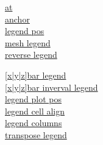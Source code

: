 {\color{blue}
\begin{minipage}[t]{3.0cm}
\href{\docurl\#pgfp./pgfplots/at}{at}\\
\href{\docurl\#pgfp./pgfplots/anchor}{anchor}\\
\href{\docurl\#pgfp./pgfplots/legend:pos}{legend pos}\\
\href{\docurl\#pgfp./pgfplots/mesh:legend}{mesh legend}\\
\href{\docurl\#pgfp./pgfplots/reverse:legend}{reverse legend}
\end{minipage}
\begin{minipage}[t]{3.0cm}
\href{\docurl\#pgfp./pgfplots/}{{[x|y|z]}bar legend}\\
\href{\docurl\#pgfp./pgfplots/}{{[x|y|z]}bar inverval legend}\\
\href{\docurl\#pgfp./pgfplots/}{legend plot pos}\\
\href{\docurl\#pgfp./pgfplots/}{legend cell align}\\
\href{\docurl\#pgfp./pgfplots/}{legend columns}\\
\href{\docurl\#pgfp./pgfplots/}{transpose legend}
\end{minipage}}

\begin{comment}
\textit{The following styles\textsuperscript{S} are available:}
{\color{blue}
\begin{minipage}[t]{3.6cm}
\href{\docurl\#pgfp./pgfplots/legend:style}{legend style}\\
\href{\docurl\#pgfp./pgfplots/every:legend:image:post}{every legend image post}\\
\href{\docurl\#pgfp./pgfplots/legend:image:post:style}{legend image post style}
    every axis legend\\
    every axis image post\\
    every legend to name picture\\
\end{minipage}
\begin{minipage}[t]{2.6cm}
\href{\docurl\#pgfp./pgfplots/line:legend}{line legend}\\
\href{\docurl\#pgfp./pgfplots/empty:legend}{empty legend}\\
\href{\docurl\#pgfp./pgfplots/area:legend}{area legend}\\
\href{\docurl\#pgfp./pgfplots/every:axis:legend}{every axis legend}
    legend style\\
    legend image post style\\
\end{minipage}}
\end{comment}


